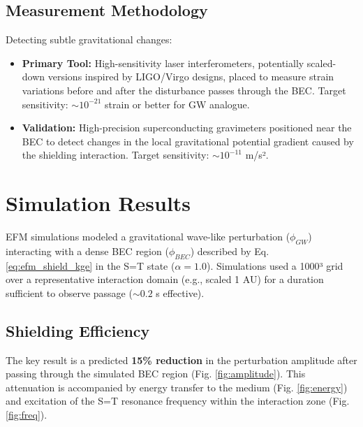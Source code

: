 \documentclass[11pt]{article}
\begin{document}
\subsection{Measurement Methodology}
Detecting subtle gravitational changes:
\begin{itemize}
    \item \textbf{Primary Tool:} High-sensitivity laser interferometers, potentially scaled-down versions inspired by LIGO/Virgo designs, placed to measure strain variations before and after the disturbance passes through the BEC. Target sensitivity: \(\sim 10^{-21}\) strain or better for GW analogue.
    \item \textbf{Validation:} High-precision superconducting gravimeters positioned near the BEC to detect changes in the local gravitational potential gradient caused by the shielding interaction. Target sensitivity: \(\sim 10^{-11}\) m/s².
\end{itemize}

\section{Simulation Results}
EFM simulations modeled a gravitational wave-like perturbation (\(\phi_{GW}\)) interacting with a dense BEC region (\(\phi_{BEC}\)) described by Eq. \ref{eq:efm_shield_kge} in the S=T state (\(\alpha=1.0\)). Simulations used a 1000³ grid over a representative interaction domain (e.g., scaled 1 AU) for a duration sufficient to observe passage (\(\sim 0.2\) s effective).

\subsection{Shielding Efficiency}
The key result is a predicted \textbf{15\% reduction} in the perturbation amplitude after passing through the simulated BEC region (Fig. \ref{fig:amplitude}). This attenuation is accompanied by energy transfer to the medium (Fig. \ref{fig:energy}) and excitation of the S=T resonance frequency within the interaction zone (Fig. \ref{fig:freq}).
\end{document}
